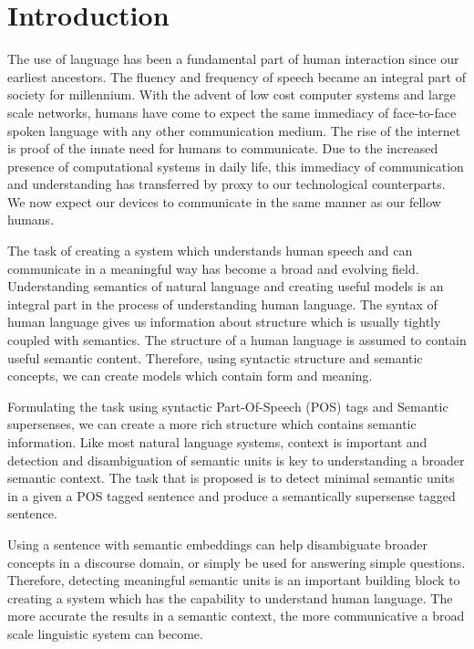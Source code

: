 \chapter{Introduction}\label{chapter1}

The use of language has been a fundamental part of human interaction since our earliest ancestors. The fluency and frequency of speech became an integral part of society for millennium. With the advent of low cost computer systems and large scale networks, humans have come to expect the same immediacy of face-to-face spoken language with any other communication medium. The rise of the internet is proof of the innate need for humans to communicate. Due to the increased presence of computational systems in daily life, this immediacy of communication and understanding has transferred by proxy to our technological counterparts. We now expect our devices to communicate in the same manner as our fellow humans.

The task of creating a system which understands human speech and can communicate in a meaningful way has become a broad and evolving field. Understanding semantics of natural language and creating useful models is an integral part in the process of understanding human language. The syntax of human language gives us information about structure which is usually tightly coupled with semantics. The structure of a human language is assumed to contain useful semantic content. Therefore, using syntactic structure and semantic concepts, we can create models which contain form and meaning. 

Formulating the task using syntactic Part-Of-Speech (POS) tags and Semantic supersenses, we can create a more rich structure which contains semantic information. Like most natural language systems, context is important and detection and disambiguation of semantic units is key to understanding a broader semantic context. The task that is proposed is to detect minimal semantic units in a given a POS tagged sentence and produce a semantically supersense tagged sentence.

Using a sentence with semantic embeddings can help disambiguate broader concepts in a discourse domain, or simply be used for answering simple questions. Therefore, detecting meaningful semantic units is an important building block to creating a system which has the capability to understand human language. The more accurate the results in a semantic context, the more communicative a broad scale linguistic system can become.

